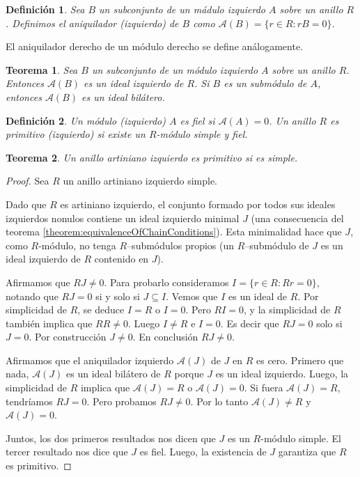 \documentclass{report}
\newtheorem{theorem}{Teorema}
\newtheorem{definition}{Definición}
\begin{document}
  \begin{definition}
    Sea \(B\) un subconjunto de un mádulo izquierdo \(A\) sobre un anillo \(R\).
    Definimos el \emph{aniquilador (izquierdo)} de \(B\) como \(\mathcal{A}(B) = \{r \in R : r B = 0\}\).
  \end{definition}

  El aniquilador derecho de un módulo derecho se define análogamente.

  \begin{theorem}\label{theorem:anihilatorTheorem}
    Sea \(B\) un subconjunto de un módulo izquierdo \(A\) sobre un anillo \(R\).
    Entonces \(\mathcal{A}(B)\) es un ideal izquierdo de \(R\).
    Si \(B\) es un submódulo de \(A\), entonces \(\mathcal{A}(B)\) es un ideal bilátero.
  \end{theorem}

  \begin{definition}
    Un módulo (izquierdo) \(A\) es \emph{fiel} si \(\mathcal{A}(A) = 0\).
    Un anillo \(R\) es \emph{primitivo} (\emph{izquierdo}) si existe un \(R\)-módulo simple y fiel.
  \end{definition}

  \begin{theorem}\label{theorem:simpleLeftArtinianRingsArePrimitive}
    Un anillo artiniano izquierdo es primitivo si es simple.
  \end{theorem}
  \begin{proof}
    Sea \(R\) un anillo artiniano izquierdo simple.

    Dado que \(R\) es artiniano izquierdo, el conjunto formado por todos sus ideales izquierdos nonulos contiene un ideal izquierdo minimal \(J\) (una consecuencia del teorema \ref{theorem:equivalenceOfChainConditions}).
    Esta minimalidad hace que \(J\), como \(R\)-módulo, no tenga \(R\)--submódulos propios (un \(R\)--submódulo de \(J\) es un ideal izquierdo de \(R\) contenido en \(J\)).

    Afirmamos que \(R J \neq 0\).
    Para probarlo consideramos \(I = \{r \in R :  R r = 0\}\), notando que \(R J = 0\) si y solo si \(J \subseteq I\).
    Vemos que \(I\) es un ideal de \(R\).
    Por simplicidad de \(R\), se deduce \(I = R\) o \(I = 0\).
    Pero \(R I = 0\), y la simplicidad de \(R\) también implica que \(R R \neq 0\).
    Luego \(I \neq R\) e \(I = 0\).
    Es decir que \(R J = 0\) solo si \(J = 0\).
    Por construcción \(J \neq 0\).
    En conclusión \(R J \neq 0\).

    Afirmamos que el aniquilador izquierdo \(\mathcal{A}(J)\) de \(J\) en \(R\) es cero.
    Primero que nada, \(\mathcal{A}(J)\) es un ideal bilátero de \(R\) porque \(J\) es un ideal izquierdo.
    Luego, la simplicidad de \(R\) implica que \(\mathcal{A}(J) = R\) o \(\mathcal{A}(J) = 0\).
    Si fuera \(\mathcal{A}(J) = R\), tendríamos \(R J = 0\).
    Pero probamos \(R J \neq 0\).
    Por lo tanto \(\mathcal{A}(J) \neq R\) y \(\mathcal{A}(J) = 0\).

    Juntos, los dos primeros resultados nos dicen que \(J\) es un \(R\)-módulo simple.
    El tercer resultado nos dice que \(J\) es fiel.
    Luego, la existencia de \(J\) garantiza que \(R\) es primitivo.
  \end{proof}
\end{document}
